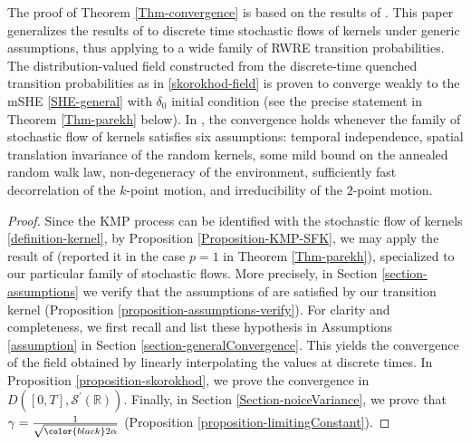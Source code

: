 \documentclass[a4paper,11pt,oneside,reqno]{amsart}
\theoremstyle{definition}
\numberwithin{equation}{section}
\begin{document}
{\color{black}The proof of Theorem \ref{Thm-convergence} is based on the results of \cite{parekh2}. This paper generalizes the results of \cite{das2024multiplicative} to discrete time  stochastic flows of kernels under generic assumptions, thus applying to a wide family of RWRE transition probabilities. The distribution-valued field constructed from the discrete-time quenched transition probabilities as in \eqref{skorokhod-field} is proven to converge weakly to the mSHE \eqref{SHE-general} with $\delta_{0}$ initial condition (see the precise statement in Theorem \ref{Thm-parekh} below). In \cite{parekh2},  the convergence holds whenever the family of stochastic flow of kernels satisfies six assumptions:  temporal independence, spatial translation invariance of the random kernels, some mild bound on the annealed random walk law, non-degeneracy of the environment,  sufficiently fast decorrelation
of the $k$-point motion, and irreducibility of the $2$-point motion.}


\begin{proof} 
Since the KMP process can be identified with the stochastic flow of kernels \eqref{definition-kernel}, by   Proposition \ref{Proposition-KMP-SFK}, we may apply the result of \cite{parekh2} (reported it in the case $p=1$ in Theorem \ref{Thm-parekh}), specialized to our particular family of stochastic flows. 
More {\color{black}precisely}, in Section \ref{section-assumptions} we verify that the assumptions of \cite{parekh2} are satisfied by our transition kernel (Proposition \ref{proposition-assumptions-verify}). For clarity and completeness,  we first  recall and list these hypothesis in Assumptions \ref{assumption} in Section \ref{section-generalConvergence}. This yields the convergence of the field obtained by linearly interpolating the values at discrete times. In Proposition \ref{proposition-skorokhod}, we prove the convergence in $D\left([0,T],\mathcal{S}^{'}(\mathbb{R})\right)$. Finally, in Section \ref{Section-noiceVariance}, we prove that $\gamma = \frac{1}{\sqrt{{\color{black}2}\alpha}}$ (Proposition \ref{proposition-limitingConstant}).  
\end{proof}
\end{document}
